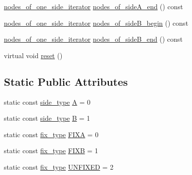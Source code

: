 \begin{DoxyCompactItemize}
\item 
\mbox{\hyperlink{classfm__partition_ac8b7b5253476118e5f7bbad2fe8af285}{nodes\+\_\+of\+\_\+one\+\_\+side\+\_\+iterator}} \mbox{\hyperlink{classfm__partition_ac4202d1d929c1700985ad5d452b735fb}{nodes\+\_\+of\+\_\+side\+A\+\_\+end}} () const
\item 
\mbox{\hyperlink{classfm__partition_ac8b7b5253476118e5f7bbad2fe8af285}{nodes\+\_\+of\+\_\+one\+\_\+side\+\_\+iterator}} \mbox{\hyperlink{classfm__partition_a4e433456ed0214c04466c4f1060b0909}{nodes\+\_\+of\+\_\+side\+B\+\_\+begin}} () const
\item 
\mbox{\hyperlink{classfm__partition_ac8b7b5253476118e5f7bbad2fe8af285}{nodes\+\_\+of\+\_\+one\+\_\+side\+\_\+iterator}} \mbox{\hyperlink{classfm__partition_a9682b070cce104bdfe69e576df57f560}{nodes\+\_\+of\+\_\+side\+B\+\_\+end}} () const
\item 
virtual void \mbox{\hyperlink{classfm__partition_a6db2eeb6ae968dbab78302f0448c0ced}{reset}} ()
\end{DoxyCompactItemize}
\subsection*{Static Public Attributes}
\begin{DoxyCompactItemize}
\item 
static const \mbox{\hyperlink{classfm__partition_a7cdff1bea3740a287387e8408e16ca79}{side\+\_\+type}} \mbox{\hyperlink{classfm__partition_a973d30e9eb0d21f659ef288176cd4791}{A}} = 0
\item 
static const \mbox{\hyperlink{classfm__partition_a7cdff1bea3740a287387e8408e16ca79}{side\+\_\+type}} \mbox{\hyperlink{classfm__partition_a42515c44eecb7ba3e2ec549a877ef238}{B}} = 1
\item 
static const \mbox{\hyperlink{classfm__partition_a63693cd93d587dca3d1842f831cd1c55}{fix\+\_\+type}} \mbox{\hyperlink{classfm__partition_a468a80e072d3ff18e5da33005825bcb1}{F\+I\+XA}} = 0
\item 
static const \mbox{\hyperlink{classfm__partition_a63693cd93d587dca3d1842f831cd1c55}{fix\+\_\+type}} \mbox{\hyperlink{classfm__partition_a0b9a66f0e8093ee83482f93d6aa5b2eb}{F\+I\+XB}} = 1
\item 
static const \mbox{\hyperlink{classfm__partition_a63693cd93d587dca3d1842f831cd1c55}{fix\+\_\+type}} \mbox{\hyperlink{classfm__partition_a24447561db0ea633212c597c5e1fca56}{U\+N\+F\+I\+X\+ED}} = 2
\end{DoxyCompactItemize}
